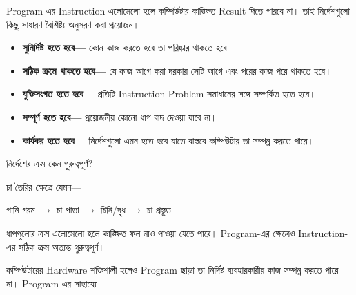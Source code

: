 
Program-এর Instruction এলোমেলো হলে কম্পিউটার কাঙ্ক্ষিত Result
দিতে পারবে না। তাই নির্দেশগুলো কিছু সাধারণ বৈশিষ্ট্য অনুসরণ করা
প্রয়োজন।

\begin{itemize}

\item \textbf{সুনির্দিষ্ট হতে হবে—} কোন কাজ করতে হবে তা পরিষ্কার থাকতে হবে।

\item \textbf{সঠিক ক্রমে থাকতে হবে—} যে কাজ আগে করা দরকার সেটি আগে
এবং পরের কাজ পরে থাকতে হবে।

\item \textbf{যুক্তিসংগত হতে হবে—} প্রতিটি Instruction Problem সমাধানের
সঙ্গে সম্পর্কিত হতে হবে।

\item \textbf{সম্পূর্ণ হতে হবে—} প্রয়োজনীয় কোনো ধাপ বাদ দেওয়া যাবে না।

\item \textbf{কার্যকর হতে হবে—} নির্দেশগুলো এমন হতে হবে যাতে বাস্তবে
কম্পিউটার তা সম্পন্ন করতে পারে।

\end{itemize}

\begin{examplebox}{নির্দেশের ক্রম কেন গুরুত্বপূর্ণ?}

চা তৈরির ক্ষেত্রে যেমন—

\begin{center}
পানি গরম
\(\rightarrow\)
চা-পাতা
\(\rightarrow\)
চিনি/দুধ
\(\rightarrow\)
চা প্রস্তুত
\end{center}

ধাপগুলোর ক্রম এলোমেলো হলে কাঙ্ক্ষিত ফল নাও পাওয়া যেতে পারে।
Program-এর ক্ষেত্রেও Instruction-এর সঠিক ক্রম অত্যন্ত গুরুত্বপূর্ণ।

\end{examplebox}


কম্পিউটারের Hardware শক্তিশালী হলেও Program ছাড়া তা নির্দিষ্ট
ব্যবহারকারীর কাজ সম্পন্ন করতে পারে না। Program-এর সাহায্যে—

